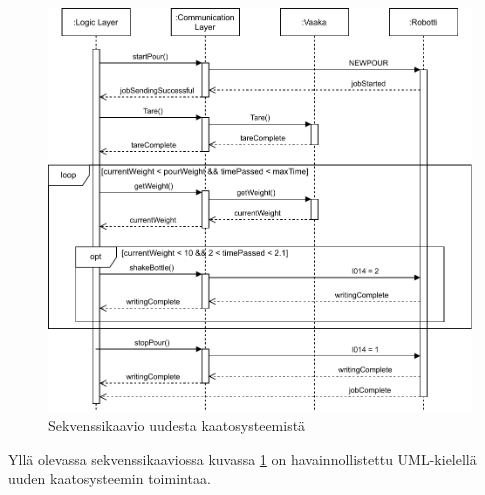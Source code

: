 \begin{figure}[!h]
\begin{center}
\includegraphics[scale=0.75]{img/sequence.pdf}
\end{center}
\caption{Sekvenssikaavio uudesta kaatosysteemistä}
\label{fig:Sequence}
\end{figure}

Yllä olevassa sekvenssikaaviossa kuvassa \ref{fig:Sequence} on havainnollistettu UML-kielellä uuden kaatosysteemin toimintaa.
